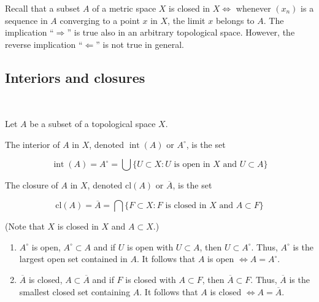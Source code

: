 \documentclass[a4paper]{article}
\begin{document}
\begin{remark}
    Recall that a subset $A$ of a metric space $X$ is closed in $X \Leftrightarrow$ whenever $\left(x_{n}\right)$ is a sequence in $A$ converging to a point $x$ in $X$, the limit $x$ belongs to $A$. The implication ``$\Rightarrow $'' is true also in an arbitrary topological space. However, the reverse implication ``$\Leftarrow$'' is not true in general.
\end{remark}

\subsection{Interiors and closures}\ \vspace{-1.5em}
\begin{definition}
    Let $A$ be a subset of a topological space $X$.

The interior of $A$ in $X$, denoted $\operatorname{int}(A)$ or $A^{\circ}$, is the set

$$
\operatorname{int}(A)=A^{\circ}=\bigcup\{U \subset X: U \text { is open in } X \text { and } U \subset A\}
$$

The closure of $A$ in $X$, denoted $\mathrm{cl}(A)$ or $\overline{A}$, is the set

$$
\mathrm{cl}(A)=\overline{A}=\bigcap\{F \subset X: F \text { is closed in } X \text { and } A \subset F\}
$$

(Note that $X$ is closed in $X$ and $A \subset X$.)
\end{definition}

\begin{remark}
    \begin{enumerate}
        \item $A^{\circ}$ is open, $A^{\circ} \subset A$ and if $U$ is open with $U \subset A$, then $U \subset A^{\circ}$. Thus, $A^{\circ}$ is the largest open set contained in $A$. It follows that $A$ is open $\Longleftrightarrow A=A^{\circ}$.
      
        \item $\overline{A}$ is closed, $A \subset \overline{A}$ and if $F$ is closed with $A \subset F$, then $\overline{A} \subset F$. Thus, $\overline{A}$ is the smallest closed set containing $A$. It follows that $A$ is closed $\Longleftrightarrow A=\overline{A}$.
      
      \end{enumerate}
\end{remark}
\end{document}
